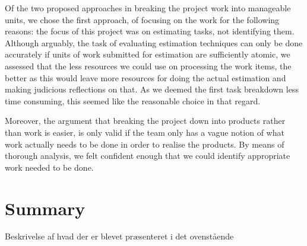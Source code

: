 Of the two proposed approaches in breaking the project work into manageable units, we chose the first approach, of focusing on the work for the following reasons: the focus of this project was on estimating tasks, not identifying them. Although arguably, the task of evaluating estimation techniques can only be done accurately if units of work submitted for estimation are sufficiently atomic, we assessed that the less resources we could use on processing the work items, the better as this would leave more resources for doing the actual estimation and making judicious reflections on that. As we deemed the first task breakdown less time consuming, this seemed like the reasonable choice in that regard.

Moreover, the argument that breaking the project down into products rather than work is easier, is only valid if the team only has a vague notion of what work actually needs to be done in order to realise the products. By means of thorough analysis, we felt confident enough that we could identify appropriate work needed to be done.


\section{Summary}
Beskrivelse af hvad der er blevet præsenteret i det ovenstående
